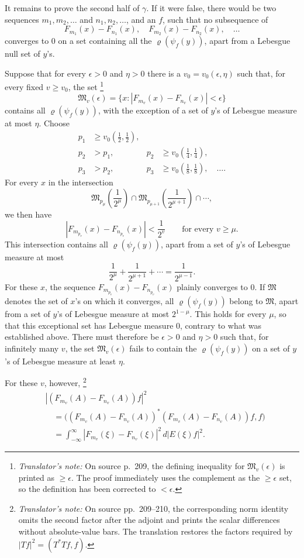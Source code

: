 \documentclass[12pt,b5paper,twoside]{article}
\newcommand{\translatorfootnote}[2]{%
  \begingroup
  \renewcommand{\thefootnote}{#1}%
  \footnote{\hspace{0.8em}\textit{Translator's note:} #2}%
  \endgroup}
\begin{document}
It remains to prove the second half of
\hyperref[thm:4.gamma]{\(\gamma\)}.  If it were false,
there would be two sequences \(m_1,m_2,\ldots\) and \(n_1,n_2,\ldots\),
and an \(f\), such that no subsequence of
\[
 F_{m_1}(x)-F_{n_1}(x),\quad
 F_{m_2}(x)-F_{n_2}(x),\quad\ldots
\]
converges to \(0\) on a set containing all the
\(\varrho(\psi_f(y))\), apart from a Lebesgue null set of \(y\)'s.

Suppose that for every \(\epsilon>0\) and \(\eta>0\) there is a
\(v_0=v_0(\epsilon,\eta)\) such that, for every fixed \(v\geq v_0\), the
set\translatorfootnote{T7}{On source p.~209, the defining inequality for
$\mathfrak M_v(\epsilon)$ is printed as $\geq\epsilon$.  The proof immediately uses
the complement as the $\geq\epsilon$ set, so the definition has been corrected to
$<\epsilon$.}
\[
 \mathfrak M_v(\epsilon)
 =\bigl\{x:|F_{m_v}(x)-F_{n_v}(x)|<\epsilon\bigr\}
\]
contains all \(\varrho(\psi_f(y))\), with the exception of a set of \(y\)'s
of Lebesgue measure at most \(\eta\).  Choose
\begin{align*}
 p_1&\geq v_0\left(\frac12,\frac12\right),\\
 p_2&>p_1, &p_2&\geq v_0\left(\frac14,\frac14\right),\\
 p_3&>p_2, &p_3&\geq v_0\left(\frac18,\frac18\right),\quad\ldots.
\end{align*}
For every \(x\) in the intersection
\[
 \mathfrak M_{p_\mu}\left(\frac1{2^\mu}\right)
 \cap\mathfrak M_{p_{\mu+1}}\left(\frac1{2^{\mu+1}}\right)
 \cap\cdots,
\]
we then have
\[
 |F_{m_{p_v}}(x)-F_{n_{p_v}}(x)|<\frac1{2^v}
 \qquad\text{for every }v\geq\mu.
\]
This intersection contains all \(\varrho(\psi_f(y))\), apart from a set of
\(y\)'s of Lebesgue measure at most
\[
 \frac1{2^\mu}+\frac1{2^{\mu+1}}+\cdots=\frac1{2^{\mu-1}}.
\]
For these \(x\), the sequence
\(F_{m_{p_v}}(x)-F_{n_{p_v}}(x)\) plainly converges to \(0\).  If
\(\mathfrak M\) denotes the set of \(x\)'s on which it converges, all
\(\varrho(\psi_f(y))\) belong to \(\mathfrak M\), apart from a set of
\(y\)'s of Lebesgue measure at most \(2^{1-\mu}\).  This holds for every
\(\mu\), so that this exceptional set has Lebesgue measure \(0\), contrary
to what was established above.  There must therefore be
\(\epsilon>0\) and \(\eta>0\) such that, for infinitely many \(v\), the
set \(\mathfrak M_v(\epsilon)\) fails to contain the
\(\varrho(\psi_f(y))\) on a set of \(y\)'s of Lebesgue measure at least
\(\eta\).

For these \(v\), however,\translatorfootnote{T8}{On source pp.~209--210, the
corresponding norm identity omits the second factor after the adjoint and prints the
scalar differences without absolute-value bars.  The translation restores the
factors required by $|Tf|^2=(T^*Tf,f)$.}
\begin{align*}
 &|(F_{m_v}(A)-F_{n_v}(A))f|^2\\
 &\quad=
 \bigl((F_{m_v}(A)-F_{n_v}(A))^*
       (F_{m_v}(A)-F_{n_v}(A))f,f\bigr)\\
 &\quad=\int_{-\infty}^{\infty}
   |F_{m_v}(\xi)-F_{n_v}(\xi)|^2\,d|E(\xi)f|^2.
\end{align*}
\end{document}
